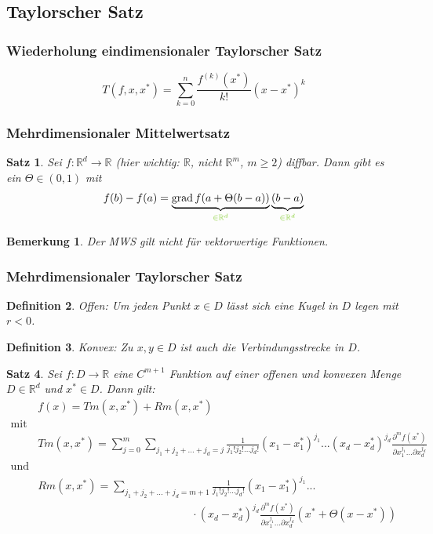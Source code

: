 \documentclass[12pt,a4paper]{article}%
\DeclareMathOperator{\grad}{grad}
\newtheorem{satz}{Satz}[section]
\newtheorem{definition}[satz]{Definition}
\newtheorem{bem}{Bemerkung}[section]
\numberwithin{equation}{section}
\newcommand{\R}{\mathbb{R}} %
\newcommand{\diffp}{\partial}
\def\colGreen#1{\begingroup\color{LimeGreen}{#1}\endgroup}
\def\ubGreen#1#2{\underbrace{#2}_{\colGreen{#1}}}
\numberwithin{equation}{subsection}
\begin{document}
  \subsection{Taylorscher Satz}
  \subsubsection{Wiederholung eindimensionaler Taylorscher Satz}
  \begin{equation}
    T(f, x, x^*) = \sum\limits_{k= 0}^n \frac{f^{(k)}(x^*)}{k!} (x-x^*)^k
  \end{equation}
  \subsubsection{Mehrdimensionaler Mittelwertsatz}
  \begin{satz}
    Sei $f: \R^d \rightarrow \R$ (hier wichtig: $\R$, nicht $\R^m$, $m\geq 2$) diffbar. Dann gibt es ein $\Theta\in (0,1)$ mit 
    \begin{equation}
      f(b) - f(a) = \ubGreen{\in \R^d}{\grad f(a+\Theta (b-a))}\ubGreen{\in \R^d}{(b-a)}
    \end{equation}
  \end{satz}
  \begin{bem}
    Der MWS gilt nicht für vektorwertige Funktionen.
  \end{bem}
  
  \subsubsection{Mehrdimensionaler Taylorscher Satz}
  \begin{definition}
    Offen: Um jeden Punkt $x \in D$ lässt sich eine Kugel in $D$ legen mit $r < 0$.
  \end{definition}
  \begin{definition}
    Konvex: Zu $x, y \in D$ ist auch die Verbindungsstrecke in $D$.
  \end{definition}
      
  \begin{satz}
    Sei $f: D\rightarrow \R$ eine $C^{m+1}$ Funktion auf einer offenen und konvexen Menge $D \in \R^d$ und $x^* \in D$. Dann gilt:
    \begin{align}
    &f(x) = Tm(x, x^*) + Rm(x, x^*) \\
    \text{mit} \nonumber \\
    &Tm(x, x^*) = \sum\limits_{j=0}^{m} \sum\limits_{j_1+j_2+...+j_d = j} \frac{1}{j_1!j_2!...j_d!} (x_1 - x_1^*)^{j_1} ... (x_d - x_d^*)^{j_d} \frac{\diffp^m f(x^*)}{\diffp x_1^{j_1} ... \diffp x_d^{j_d}} &\\
    \text{und} \nonumber \\
    &Rm(x, x^*) = \sum\limits_{j_1+j_2+...+j_d = m+1} \frac{1}{j_1!j_2!...j_d!} (x_1 - x_1^*)^{j_1} ...\nonumber \\ 
    &\qquad \qquad \qquad \qquad \qquad \qquad \qquad \cdot(x_d - x_d^*)^{j_d} \frac{\diffp^m f(x^*)}{\diffp x_1^{j_1} ... \diffp x_d^{j_d}}(x^* + \Theta(x-x^*))
    \end{align}
  \end{satz}
  
\end{document}
